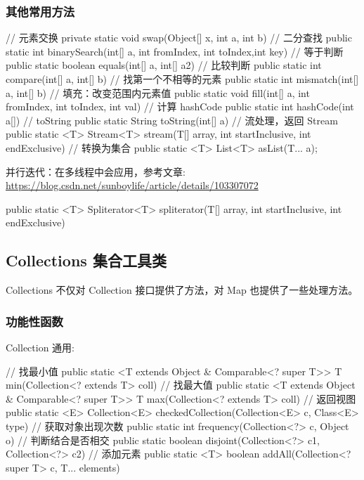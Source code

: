 \subsubsection*{其他常用方法}

\begin{Java}
// 元素交换
private static void swap(Object[] x, int a, int b)
// 二分查找
public static int binarySearch(int[] a, int fromIndex, int toIndex,int key)
// 等于判断
public static boolean equals(int[] a, int[] a2)
// 比较判断
public static int compare(int[] a, int[] b)
// 找第一个不相等的元素
public static int mismatch(int[] a, int[] b)
// 填充：改变范围内元素值
public static void fill(int[] a, int fromIndex, int toIndex, int val)
// 计算 hashCode
public static int hashCode(int a[])
// toString
public static String toString(int[] a)
// 流处理，返回 Stream
public static <T> Stream<T> stream(T[] array, int startInclusive, int endExclusive)
// 转换为集合
public static <T> List<T> asList(T... a);
\end{Java}

并行迭代：在多线程中会应用，参考文章: \url{https://blog.csdn.net/sunboylife/article/details/103307072}

\begin{Java}
public static <T> Spliterator<T> spliterator(T[] array, int startInclusive, int endExclusive)
\end{Java}

\subsection{Collections 集合工具类}

Collections 不仅对 Collection 接口提供了方法，对 Map 也提供了一些处理方法。

\subsubsection*{功能性函数}

Collection 通用:

\begin{Java}
// 找最小值
public static <T extends Object & Comparable<? super T>> T min(Collection<? extends T> coll)
// 找最大值
public static <T extends Object & Comparable<? super T>> T max(Collection<? extends T> coll)
// 返回视图
public static <E> Collection<E> checkedCollection(Collection<E> c, Class<E> type)
// 获取对象出现次数
public static int frequency(Collection<?> c, Object o)
// 判断结合是否相交
public static boolean disjoint(Collection<?> c1, Collection<?> c2)
// 添加元素
public static <T> boolean addAll(Collection<? super T> c, T... elements)
\end{Java}

